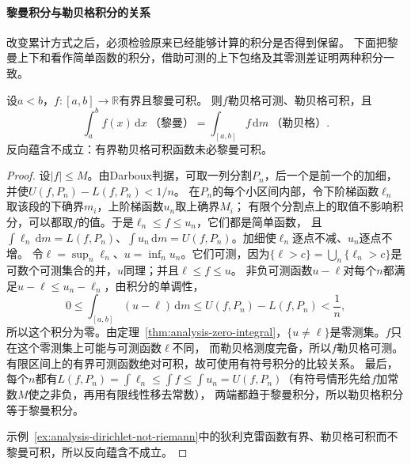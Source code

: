 \paragraph{黎曼积分与勒贝格积分的关系}
改变累计方式之后，必须检验原来已经能够计算的积分是否得到保留。
下面把黎曼上下和看作简单函数的积分，借助可测的上下包络及其零测差证明两种积分一致。
\begin{theorem}[黎曼积分与勒贝格积分的一致性]
\label{thm:analysis-riemann-lebesgue-consistency}
设$a<b$，$f:[a,b]\to\mathbb R$有界且黎曼可积。
则$f$勒贝格可测、勒贝格可积，且
\[
 \int_a^bf(x)\,\mathrm dx\ \text{（黎曼）}
 =\int_{[a,b]}f\,\mathrm dm\ \text{（勒贝格）}.
\]
反向蕴含不成立：有界勒贝格可积函数未必黎曼可积。
\end{theorem}
\begin{proof}
设$|f|\leq M$。由Darboux判据，可取一列分割$P_n$，后一个是前一个的加细，并使$U(f,P_n)-L(f,P_n)<1/n$。
在$P_n$的每个小区间内部，令下阶梯函数$\ell_n$取该段的下确界$m_i$，上阶梯函数$u_n$取上确界$M_i$；
有限个分割点上的取值不影响积分，可以都取$f$的值。于是$\ell_n\leq f\leq u_n$，它们都是简单函数，
且$\int\ell_n\,\mathrm dm=L(f,P_n)$、$\int u_n\,\mathrm dm=U(f,P_n)$。加细使$\ell_n$逐点不减、$u_n$逐点不增。
令$\ell=\sup_n\ell_n$、$u=\inf_nu_n$。它们可测，因为$\{\ell>c\}=\bigcup_n\{\ell_n>c\}$是可数个可测集合的并，$u$同理；并且$\ell\leq f\leq u$。
非负可测函数$u-\ell$对每个$n$都满足$u-\ell\leq u_n-\ell_n$，由积分的单调性，
\[
 0\leq\int_{[a,b]}(u-\ell)\,\mathrm dm\leq U(f,P_n)-L(f,P_n)<\frac1n,
\]
所以这个积分为零。由定理~\ref{thm:analysis-zero-integral}，$\{u\neq\ell\}$是零测集。$f$只在这个零测集上可能与可测函数$\ell$不同，
而勒贝格测度完备，所以$f$勒贝格可测。有限区间上的有界可测函数绝对可积，故可使用有符号积分的比较关系。
最后，每个$n$都有$L(f,P_n)=\int\ell_n\leq\int f\leq\int u_n=U(f,P_n)$（有符号情形先给$f$加常数$M$使之非负，再用有限线性移去常数），
两端都趋于黎曼积分，所以勒贝格积分等于黎曼积分。

示例~\ref{ex:analysis-dirichlet-not-riemann}中的狄利克雷函数有界、勒贝格可积而不黎曼可积，所以反向蕴含不成立。
\end{proof}

